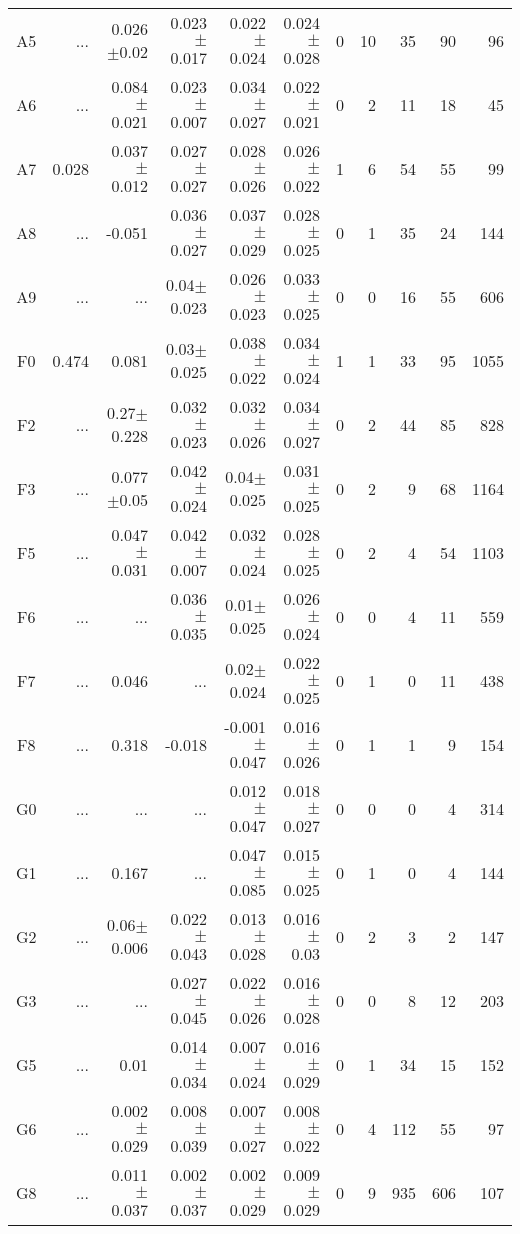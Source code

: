 \begin{table}[t]
\begin{center}
\begin{tabular}{c|rrrrr|rrrrr}
A5	&	 ...	&	0.026$\pm$0.02	&	0.023$\pm$0.017	&	0.022$\pm$0.024	&	0.024$\pm$0.028	&	0	&	10	&	35	&	90	&	96	\\
A6	&	 ...	&	0.084$\pm$0.021	&	0.023$\pm$0.007	&	0.034$\pm$0.027	&	0.022$\pm$0.021	&	0	&	2	&	11	&	18	&	45	\\
A7	&	0.028	&	0.037$\pm$0.012	&	0.027$\pm$0.027	&	0.028$\pm$0.026	&	0.026$\pm$0.022	&	1	&	6	&	54	&	55	&	99	\\
A8	&	 ...	&	-0.051	&	0.036$\pm$0.027	&	0.037$\pm$0.029	&	0.028$\pm$0.025	&	0	&	1	&	35	&	24	&	144	\\
A9	&	 ...	&	 ...	&	0.04$\pm$0.023	&	0.026$\pm$0.023	&	0.033$\pm$0.025	&	0	&	0	&	16	&	55	&	606	\\
F0	&	0.474	&	0.081	&	0.03$\pm$0.025	&	0.038$\pm$0.022	&	0.034$\pm$0.024	&	1	&	1	&	33	&	95	&	1055	\\
F2	&	 ...	&	0.27$\pm$0.228	&	0.032$\pm$0.023	&	0.032$\pm$0.026	&	0.034$\pm$0.027	&	0	&	2	&	44	&	85	&	828	\\
F3	&	 ...	&	0.077$\pm$0.05	&	0.042$\pm$0.024	&	0.04$\pm$0.025	&	0.031$\pm$0.025	&	0	&	2	&	9	&	68	&	1164	\\
F5	&	 ...	&	0.047$\pm$0.031	&	0.042$\pm$0.007	&	0.032$\pm$0.024	&	0.028$\pm$0.025	&	0	&	2	&	4	&	54	&	1103	\\
F6	&	 ...	&	 ...	&	0.036$\pm$0.035	&	0.01$\pm$0.025	&	0.026$\pm$0.024	&	0	&	0	&	4	&	11	&	559	\\
F7	&	 ...	&	0.046	&	 ...	&	0.02$\pm$0.024	&	0.022$\pm$0.025	&	0	&	1	&	0	&	11	&	438	\\
F8	&	 ...	&	0.318	&	-0.018	&	-0.001$\pm$0.047	&	0.016$\pm$0.026	&	0	&	1	&	1	&	9	&	154	\\
G0	&	 ...	&	 ...	&	 ...	&	0.012$\pm$0.047	&	0.018$\pm$0.027	&	0	&	0	&	0	&	4	&	314	\\
G1	&	 ...	&	0.167	&	 ...	&	0.047$\pm$0.085	&	0.015$\pm$0.025	&	0	&	1	&	0	&	4	&	144	\\
G2	&	 ...	&	0.06$\pm$0.006	&	0.022$\pm$0.043	&	0.013$\pm$0.028	&	0.016$\pm$0.03	&	0	&	2	&	3	&	2	&	147	\\
G3	&	 ...	&	 ...	&	0.027$\pm$0.045	&	0.022$\pm$0.026	&	0.016$\pm$0.028	&	0	&	0	&	8	&	12	&	203	\\
G5	&	 ...	&	0.01	&	0.014$\pm$0.034	&	0.007$\pm$0.024	&	0.016$\pm$0.029	&	0	&	1	&	34	&	15	&	152	\\
G6	&	 ...	&	0.002$\pm$0.029	&	0.008$\pm$0.039	&	0.007$\pm$0.027	&	0.008$\pm$0.022	&	0	&	4	&	112	&	55	&	97	\\
G8	&	 ...	&	0.011$\pm$0.037	&	0.002$\pm$0.037	&	0.002$\pm$0.029	&	0.009$\pm$0.029	&	0	&	9	&	935	&	606	&	107	\\

\end{tabular}
\end{center}
\end{table}

